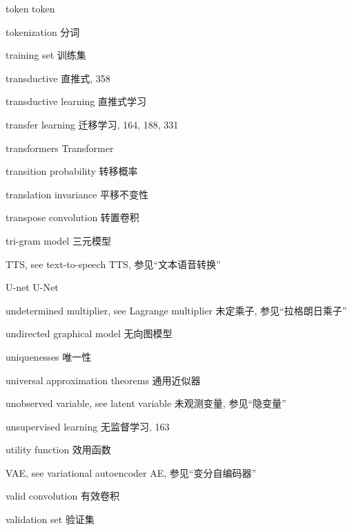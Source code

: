token  token \par
tokenization  分词 \par
training set  训练集 \par
transductive  直推式, 358 \par
transductive learning  直推式学习 \par
transfer learning  迁移学习, 164, 188, 331 \par
transformers  Transformer \par
transition probability  转移概率 \par
translation invariance  平移不变性 \par
transpose convolution  转置卷积 \par
tri-gram model  三元模型 \par
TTS, see text-to-speech  TTS, 参见“文本语音转换” \par
U-net  U-Net \par
undetermined multiplier, see Lagrange multiplier  未定乘子, 参见“拉格朗日乘子” \par
undirected graphical model  无向图模型 \par
uniquenesses  唯一性 \par
universal approximation theorems  通用近似器 \par
unobserved variable, see latent variable  未观测变量, 参见“隐变量” \par
unsupervised learning  无监督学习, 163 \par
utility function  效用函数 \par
VAE, see variational autoencoder  AE, 参见“变分自编码器” \par
valid convolution  有效卷积 \par
validation set  验证集 \par

